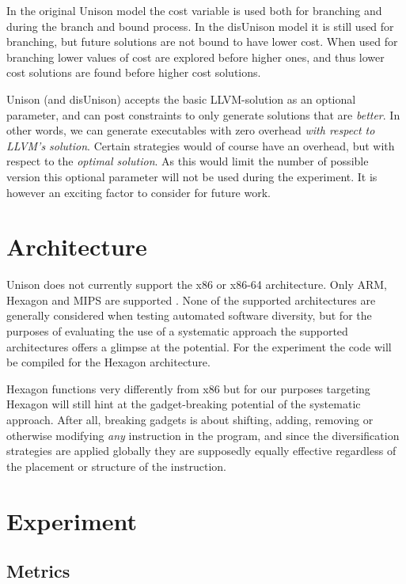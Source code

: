 In the original Unison model the cost variable is used both for branching and during the
branch and bound process. In the disUnison model it is still used for branching, but future
solutions are not bound to have lower cost. When used for branching lower values of cost
are explored before higher ones, and thus lower cost solutions are found before higher
cost solutions.

Unison (and disUnison) accepts the basic LLVM-solution as an optional parameter, and can
post constraints to only generate solutions that are \textit{better}. In other words, we
can generate executables with zero overhead \textit{with respect to LLVM's solution}.
Certain strategies would of course have an overhead, but with respect to the
\textit{optimal solution}. As this would limit the number of possible version this
optional parameter will not be used during the experiment. It is however an exciting
factor to consider for future work.


\section{Architecture}
\label{sec:arch}

Unison does not currently support the x86 or x86-64 architecture. Only ARM, Hexagon and MIPS
are supported \cite{unison-src}. None of the supported architectures are generally considered
when testing automated software diversity, but for the purposes of evaluating the use of
a systematic approach the supported architectures offers a glimpse at the potential. For
the experiment the code will be compiled for the Hexagon architecture.

Hexagon functions very differently from x86 but for our purposes targeting Hexagon will
still hint at the gadget-breaking potential of the systematic approach. After all,
breaking gadgets is about shifting, adding, removing or otherwise modifying \textit{any}
instruction in the program, and since the diversification strategies are applied globally
they are supposedly equally effective regardless of the placement or structure of the
instruction.

\section{Experiment}

\subsection{Metrics}


